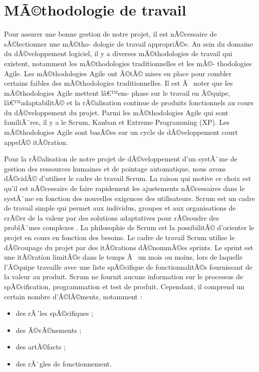 \section{MÃ©thodologie de travail}

Pour assurer une bonne gestion de notre projet, il est nÃ©cessaire de sÃ©lectionner une mÃ©tho-
dologie de travail appropriÃ©e. Au sein du domaine du dÃ©veloppement logiciel, il y a diverses
mÃ©thodologies de travail qui existent, notamment les mÃ©thodologies traditionnelles et les mÃ©-
thodologies Agile. Les mÃ©thodologies Agile ont Ã©tÃ© mises en place pour combler certains faibles
des mÃ©thodologies traditionnelles. Il est Ã  noter que les mÃ©thodologies Agile mettent lâ€™em-
phase sur le travail en Ã©quipe, lâ€™adaptabilitÃ© et la rÃ©alisation continue de produits fonctionnels
au cours du dÃ©veloppement du projet. Parmi les mÃ©thodologies Agile qui sont familiÃ¨res, il y a
le Scrum, Kanban et Extreme Programming (XP). Les mÃ©thodologies Agile sont basÃ©es sur un
cycle de dÃ©veloppement court appelÃ© itÃ©ration.

Pour la rÃ©alisation de notre projet de dÃ©veloppement d'un systÃ¨me de gestion des ressources
humaines et de pointage automatique, nous avons dÃ©cidÃ© d'utiliser le cadre de travail Scrum.
La raison qui motive ce choix est qu'il est nÃ©cessaire de faire rapidement les ajustements
nÃ©cessaires dans le systÃ¨me en fonction des nouvelles exigences des utilisateurs. Scrum est un
cadre de travail simple qui permet aux individus, groupes et aux organisations de crÃ©er de la
valeur par des solutions adaptatives pour rÃ©soudre des problÃ¨mes complexes \cite{Scrum}. \newline
La philosophie
de Scrum est la possibilitÃ© d'orienter le projet en cours en fonction des besoins.
Le cadre de travail Scrum utilise le dÃ©coupage du projet par des itÃ©rations dÃ©nommÃ©es
sprints. Le sprint est une itÃ©ration limitÃ©e dans le temps Ã  un mois ou moins, lors de laquelle
l'Ã©quipe travaille avec une liste spÃ©cifique de fonctionnalitÃ©s fournissant de la valeur au produit.
Scrum ne fournit aucune information sur le processus de spÃ©cification, programmation et
test de produit. Cependant, il comprend un certain nombre d'Ã©lÃ©ments, notamment :

\begin{itemize}[label=$\bullet$]
\item des rÃ´les spÃ©cifiques ;
\item des Ã©vÃ©nements ;
\item des artÃ©facts ;
\item des rÃ¨gles de fonctionnement.
\end{itemize}

